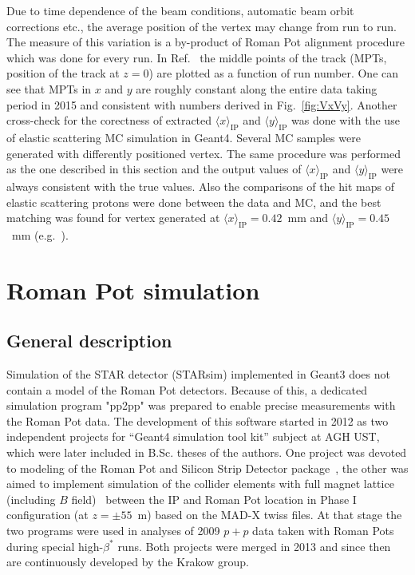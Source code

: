 Due to time dependence of the beam conditions, automatic beam orbit corrections etc., the average position of the vertex may change from run to run. The measure of this variation is a by-product of Roman Pot alignment procedure which was done for every run. In Ref.~\cite{AverageVertexBogdan} the middle points of the track (MPTs, position of the track at $z=0$) are plotted as a function of run number. One can see that MPTs in $x$ and $y$ are roughly constant along the entire data taking period in 2015 and consistent with numbers derived in Fig.~\ref{fig:VxVy}. Another cross-check for the corectness of extracted $\langle x\rangle_{\text{IP}}$ and $\langle y\rangle_{\text{IP}}$ was done with the use of elastic scattering MC simulation in Geant4. Several MC samples were generated with differently positioned vertex. The same procedure was performed as the one described in this section and the output values of $\langle x\rangle_{\text{IP}}$ and $\langle y\rangle_{\text{IP}}$ were always consistent with the true values. Also the comparisons of the hit maps of elastic scattering protons were done between the data and MC, and the best matching was found for vertex generated at $\langle x\rangle_{\text{IP}} = 0.42$~mm and $\langle y\rangle_{\text{IP}} = 0.45$~mm (e.g.~\cite{AlignmentValidation}).


\section{Roman Pot simulation}

\subsection{General description}
Simulation of the STAR detector (STARsim) implemented in Geant3 does not contain a model of the Roman Pot detectors. Because of this, a dedicated simulation program "pp2pp" was prepared to enable precise measurements with the Roman Pot data. The development of this software started in 2012 as two independent projects for ``Geant4 simulation tool kit'' subject at AGH UST, which were later included in B.Sc. theses of the authors. One project was devoted to modeling of the Roman Pot and Silicon Strip Detector package~\cite{BScThesisRafal}, the other was aimed to implement simulation of the collider elements with full magnet lattice (including $B$ field)~\cite{BScThesisLukasz} between the IP and Roman Pot location in Phase I configuration (at $z=\pm55$~m) based on the MAD-X twiss files. At that stage the two programs were used in analyses of 2009 $p+p$ data \cite{MScLukasz,Sikora:2014hca} taken with Roman Pots during special high-$\beta^{*}$ runs. Both projects were merged in 2013 and since then are continuously developed by the Krakow group.

